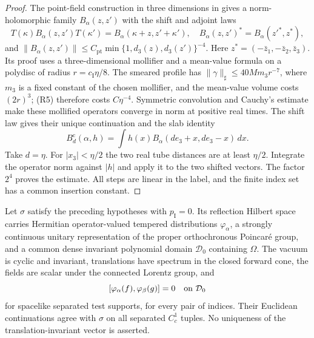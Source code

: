 \documentclass[11pt,letterpaper,reqno]{amsart}
\makeatletter
\theoremstyle{definition}
\newcommand{\ms@majorstart}{%
  \pushQED{\qed}\renewcommand{\qedsymbol}{$\blacksquare\square$}}
\newenvironment{theorem}[1][]{\ms@majorstart\ms@theorem[#1]}
  {\popQED\endms@theorem}
\theoremstyle{remark}
\makeatother
\begin{document}
\begin{proof}
The point-field construction in three dimensions in
\cite[Proposition 97.2]{YMM1} gives a norm-holomorphic
family $B_\alpha(z,z')$ with the shift and adjoint laws
\[
 T(\kappa)B_\alpha(z,z')T(\kappa')
                   =B_\alpha(\kappa+z,z'+\kappa'),
 \quad B_\alpha(z,z')^*=B_\alpha(z'^*,z^*),
\]
and
$\|B_\alpha(z,z')\|\le C_{\mathrm{pt}}
\min\{1,d_3(z),d_3(z')\}^{-4}$.
Here $z^*=(-\bar z_1,-\bar z_2,\bar z_3)$.
Its proof uses a three-dimensional mollifier and a
mean-value formula on a polydisc of radius
$r=c_{\mathrm I}\eta/8$.  The smeared profile has
$\|\gamma\|_\sharp\le40Mm_3r^{-7}$, where $m_3$ is a fixed
constant of the chosen mollifier, and the
mean-value volume costs $(2r)^3$; (R5) therefore
costs $C\eta^{-4}$.  Symmetric convolution and
Cauchy's estimate make these mollified operators
converge in norm at positive real times.  The shift
law gives their unique continuation and the slab
identity
\[
 B_d^{\mathrm c}(\alpha,h)=
       \int h(x)B_\alpha(de_3+x,de_3-x)\,dx.
\]
Take $d=\eta$. For $|x_3|<\eta/2$ the two real tube distances are
at least $\eta/2$.  Integrate the operator norm
against $|h|$ and apply it to the two shifted
vectors.  The factor $2^4$ proves the estimate.
All steps are linear in the label, and the finite
index set has a common insertion constant.
\end{proof}

\begin{theorem}[Finite-family reconstruction]\label{C-389-34}
Let $\sigma$ satisfy the preceding hypotheses with
$p_{\mathrm I}=0$.  Its reflection Hilbert space
carries Hermitian operator-valued tempered
distributions $\varphi_\alpha$, a strongly continuous
unitary representation of the proper orthochronous
Poincar\'e group, and a common dense invariant
polynomial domain $\mathcal D_0$ containing $\Omega$.
The vacuum is cyclic and invariant, translations
have spectrum in the closed forward cone, the
fields are scalar under the connected Lorentz
group, and
\[
 [\varphi_\alpha(f),\varphi_\beta(g)]=0
 \quad\hbox{on }\mathcal D_0
\]
for spacelike separated test supports, for every
pair of indices.  Their Euclidean continuations
agree with $\sigma$ on all separated $C_c^1$ tuples.
No uniqueness of the translation-invariant vector
is asserted.
\end{theorem}
\end{document}
